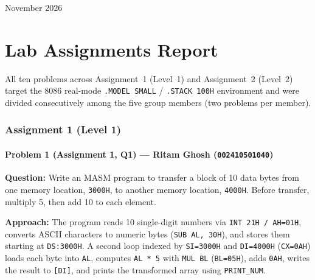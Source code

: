 \documentclass[11pt,a4paper]{article}
\begin{document}
\begin{titlepage}
    \vfill
    {\normalsize November 2026 \par}
\end{titlepage}

\tableofcontents
\newpage

\part{Lab Assignments Report}

All ten problems across Assignment~1 (Level~1) and Assignment~2 (Level~2) target the 8086 real-mode \texttt{.MODEL SMALL} / \texttt{.STACK 100H} environment and were divided consecutively among the five group members (two problems per member).

\section{Assignment 1 (Level 1)}

\subsection{Problem 1 (Assignment 1, Q1) --- Ritam Ghosh (\texttt{002410501040})}

\textbf{Question:} Write an MASM program to transfer a block of 10 data bytes from one memory location, \texttt{3000H}, to another memory location, \texttt{4000H}. Before transfer, multiply 5, then add 10 to each element.

\textbf{Approach:} The program reads 10 single-digit numbers via \texttt{INT 21H / AH=01H}, converts ASCII characters to numeric bytes (\texttt{SUB AL, 30H}), and stores them starting at \texttt{DS:3000H}. A second loop indexed by \texttt{SI=3000H} and \texttt{DI=4000H} (\texttt{CX=0AH}) loads each byte into \texttt{AL}, computes \texttt{AL * 5} with \texttt{MUL BL} (\texttt{BL=05H}), adds \texttt{0AH}, writes the result to \texttt{[DI]}, and prints the transformed array using \texttt{PRINT\_NUM}.


\end{document}
